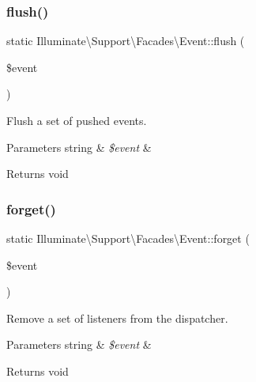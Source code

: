 \subsubsection{\texorpdfstring{flush()}{flush()}}
{\footnotesize\ttfamily static Illuminate\textbackslash{}\+Support\textbackslash{}\+Facades\textbackslash{}\+Event\+::flush (\begin{DoxyParamCaption}\item[{}]{\$event }\end{DoxyParamCaption})\hspace{0.3cm}{\ttfamily [static]}}

Flush a set of pushed events.


\begin{DoxyParams}[1]{Parameters}
string & {\em \$event} & \\
\hline
\end{DoxyParams}
\begin{DoxyReturn}{Returns}
void 
\end{DoxyReturn}
\mbox{\label{class_illuminate_1_1_support_1_1_facades_1_1_event_a34e852aad1b68390255dcdb664fcdf13}} 
\subsubsection{\texorpdfstring{forget()}{forget()}}
{\footnotesize\ttfamily static Illuminate\textbackslash{}\+Support\textbackslash{}\+Facades\textbackslash{}\+Event\+::forget (\begin{DoxyParamCaption}\item[{}]{\$event }\end{DoxyParamCaption})\hspace{0.3cm}{\ttfamily [static]}}

Remove a set of listeners from the dispatcher.


\begin{DoxyParams}[1]{Parameters}
string & {\em \$event} & \\
\hline
\end{DoxyParams}
\begin{DoxyReturn}{Returns}
void 
\end{DoxyReturn}
\mbox{\label{class_illuminate_1_1_support_1_1_facades_1_1_event_ad1e8988ddbc72a930b91bb9e30b15c6e}} 
